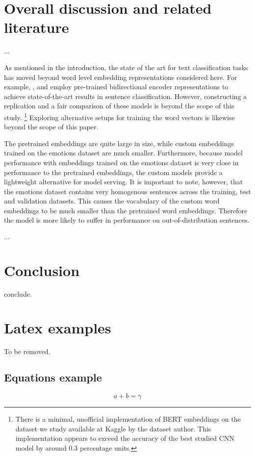 \documentclass[conference]{IEEEtran}
\begin{document}
\section{Overall discussion and related literature}
...

As mentioned in the introduction, the state of the art for text classification tasks has moved beyond word level embedding representations considered here. For example, \cite{bert}, \cite{xlnet} and \cite{bertclassification} employ pre-trained bidirectional encoder representations to achieve state-of-the-art results in sentence classification. However, constructing a replication and a fair comparison of these models is beyond the scope of this study.
\footnote{There is a minimal, unofficial implementation of BERT\cite{bert} embeddings on the dataset we study\cite{kaggledata} available at Kaggle by the dataset author. This implementation appears to exceed the accuracy of the best studied CNN model by around 0.3 percentage units.}
Exploring alternative setups for training the word vectors is likewise beyond the scope of this paper.

The pretrained embeddings are quite large in size, while custom embeddings trained on the emotions dataset are much smaller. Furthermore, because model performance with embeddings trained on the emotions dataset is very close in performance to the pretrained embeddings, the custom models provide a lightweight alternative for model serving. It is important to note, however, that the emotions dataset contains very homogenous sentences across the training, test and validation datasets. This causes the vocabulary of the custom word embeddings to be much smaller than the pretrained word embeddings. Therefore the model is more likely to suffer in performance on out-of-distribution sentences.

...
\section{Conclusion}
conclude.

\section{Latex examples}

To be removed.

\subsection{Equations example}
\begin{equation}
a+b=\gamma\label{eq}
\end{equation}
\end{document}
